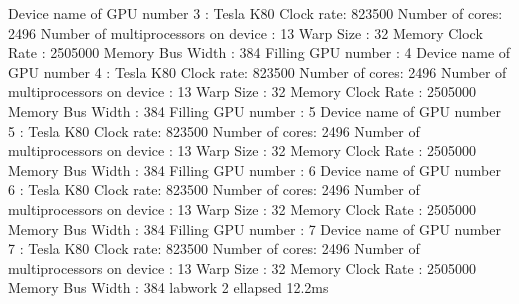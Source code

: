 \documentclass{article}
\begin{document}
Device name of GPU number 3 : Tesla K80 \newline
Clock rate: 823500 \newline
Number of cores: 2496 \newline
Number of multiprocessors on device : 13 \newline
Warp Size : 32 \newline
Memory Clock Rate : 2505000 \newline
Memory Bus Width : 384 \newline
Filling GPU number : 4 \newline
Device name of GPU number 4 : Tesla K80 \newline
Clock rate: 823500 \newline
Number of cores: 2496 \newline
Number of multiprocessors on device : 13 \newline
Warp Size : 32 \newline
Memory Clock Rate : 2505000 \newline
Memory Bus Width : 384 \newline
Filling GPU number : 5 \newline
Device name of GPU number 5 : Tesla K80 \newline
Clock rate: 823500 \newline
Number of cores: 2496 \newline
Number of multiprocessors on device : 13 \newline
Warp Size : 32 \newline
Memory Clock Rate : 2505000 \newline
Memory Bus Width : 384 \newline
Filling GPU number : 6 \newline
Device name of GPU number 6 : Tesla K80 \newline
Clock rate: 823500 \newline
Number of cores: 2496 \newline
Number of multiprocessors on device : 13 \newline
Warp Size : 32 \newline
Memory Clock Rate : 2505000 \newline
Memory Bus Width : 384 \newline
Filling GPU number : 7 \newline
Device name of GPU number 7 : Tesla K80 \newline
Clock rate: 823500 \newline
Number of cores: 2496 \newline
Number of multiprocessors on device : 13 \newline
Warp Size : 32 \newline
Memory Clock Rate : 2505000 \newline
Memory Bus Width : 384 \newline
labwork 2 ellapsed 12.2ms \newline
\end{document}

